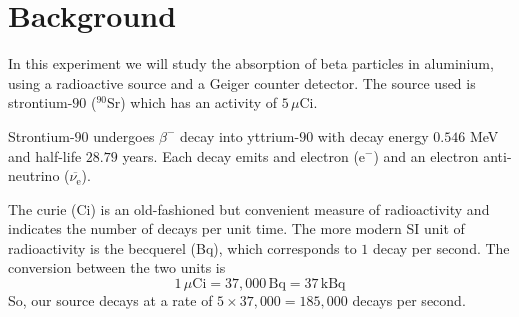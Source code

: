 \section{Background}%

In this experiment we will study the absorption of beta particles in aluminium, using a radioactive source and a Geiger counter detector. The source used is strontium-$90$ ($^{90}$Sr) which has an activity of $5\,\mu$Ci. 

Strontium-$90$ undergoes $\beta^{-}$ decay into yttrium-$90$ with decay energy $0.546$ MeV and half-life $28.79$ years. Each decay emits and electron ($\mathrm{e}^-$) and an electron anti-neutrino ($\overbar{\nu_\mathrm{e}}$).

The curie (Ci) is an old-fashioned but convenient measure of radioactivity and indicates the number of decays per unit time. The more modern SI unit of radioactivity is the becquerel (Bq), which corresponds to $1$ decay per second. The conversion between the two units is 
\begin{displaymath}
  1\,\mu\textrm{Ci} = 37,000\,\textrm{Bq} = 37\,\textrm{kBq} 
\end{displaymath}
So, our source decays at a rate of $5\times37,000=185,000$ decays per second.

